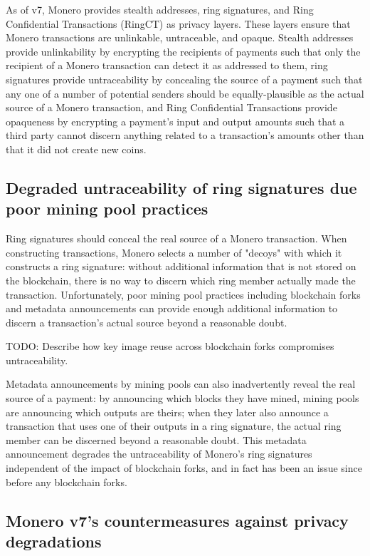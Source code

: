 \documentclass[notitlepage]{report}
\begin{document}
As of v7, Monero provides stealth addresses, ring signatures, and Ring Confidential Transactions (RingCT) as privacy layers.  These layers ensure that Monero transactions are unlinkable, untraceable, and opaque.  Stealth addresses provide unlinkability by encrypting the recipients of payments such that only the recipient of a Monero transaction can detect it as addressed to them, ring signatures provide untraceability by concealing the source of a payment such that any one of a number of potential senders should be equally-plausible as the actual source of a Monero transaction, and Ring Confidential Transactions provide opaqueness by encrypting a payment's input and output amounts such that a third party cannot discern anything related to a transaction's amounts other than that it did not create new coins.

\subsection{Degraded untraceability of ring signatures due poor mining pool practices}

Ring signatures should conceal the real source of a Monero transaction.  When constructing transactions, Monero selects a number of "decoys" with which it constructs a ring signature: without additional information that is not stored on the blockchain, there is no way to discern which ring member actually made the transaction.  Unfortunately, poor mining pool practices including blockchain forks and metadata announcements can provide enough additional information to discern a transaction's actual source beyond a reasonable doubt.

TODO: Describe how key image reuse across blockchain forks compromises untraceability.

Metadata announcements by mining pools can also inadvertently reveal the real source of a payment: by announcing which blocks they have mined, mining pools are announcing which outputs are theirs; when they later also announce a transaction that uses one of their outputs in a ring signature, the actual ring member can be discerned beyond a reasonable doubt.  This metadata announcement degrades the untraceability of Monero's ring signatures independent of the impact of blockchain forks, and in fact has been an issue since before any blockchain forks.

\subsection{Monero v7's countermeasures against privacy degradations}
\end{document}
